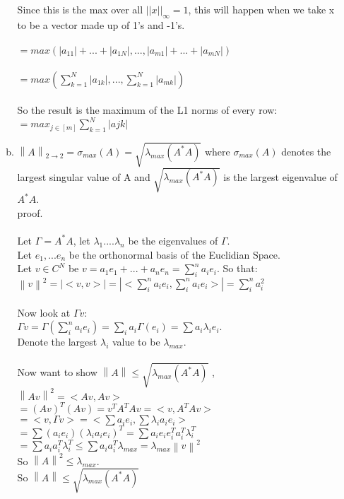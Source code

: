 \documentclass[11pt,leqno,fleqn]{article}
\newcommand{\norm}[1]{\left\lVert#1\right\rVert}
\begin{document}
\begin{enumerate}[(1)]
\begin{enumerate}[(a)]
Since this is the max over all $||x||_{\infty} = 1$, this will happen when we take x to be a vector made up of 1's and -1's. \\ \\
$=  max(|a_{11}| + ... + |a_{1N}|, ... , |a_{m1}| + ... + |a_{mN}| ) $\\ \\
$ = max(\sum_{k =1}^N |a_{1k}|, ... , \sum_{k =1}^N |a_{mk}|) $ \\ \\
So the result is the maximum of the L1 norms of every row:\\
$ = max_{j \in [m]} \sum_{k =1}^N |ajk|$

\newpage
\item $\norm{A}_{2 \to 2} = \sigma_{max}(A) = \sqrt{\lambda_{max}(A^*A)}$ where $ \sigma_{max}(A)$ denotes the largest singular value
of A and $ \sqrt{\lambda_{max}(A^*A)}$ is the largest eigenvalue of $A^*A$.\\
proof.\\ \\
Let $\Gamma = A^*A$, let $\lambda_1 .... \lambda_n$ be the eigenvalues of $\Gamma$. \\
Let ${e_1,...e_n}$ be the orthonormal basis of the Euclidian Space.\\
Let $v \in C^N$ be $v = a_1 e_1 + ... + a_n e_n = \sum_i^n a_i e_i$. So that: \\
 $\norm{v}^2 = |<v,v>| = |<\sum_i^n a_i e_i, \sum_i^n a_i e_i>| = \sum_i^n a_i ^2$ \\ \\
 Now look at $\Gamma v$:\\
 $\Gamma v = \Gamma (\sum_i^n a_i e_i) = \sum_i a_i \Gamma(e_i) = \sum a_i \lambda_i e_i$. \\
 Denote the largest $\lambda_i$ value to be $\lambda_{max}$.\\ \\
 Now want to show $\norm{A} \leq \sqrt{\lambda_{max}(A^*A)}$ ,\\
 $\norm{Av}^2 = <Av,Av>$\\
 $= (Av)^T (Av) = v^T A^T Av = <v, A^T A v>$\\
 $= <v, \Gamma v> = <\sum a_i e_i, \sum \lambda_i a_i e_i>$\\
$= \sum (a_i e_i)(\lambda_i a_i e_i)^T = \sum a_i e_i e_i^T a_i^T \lambda_i^T$\\
$ = \sum a_i a_i^T \lambda_i^T \leq \sum a_i a_i^T \lambda_{max} = \lambda_{max} \norm{v}^2$\\
So $\norm{A}^2 \leq \lambda_{max} $. \\
So $\norm{A} \leq \sqrt{\lambda_{max}(A^*A)}$\\ \\


\end{enumerate}
\end{enumerate}
\end{document}
